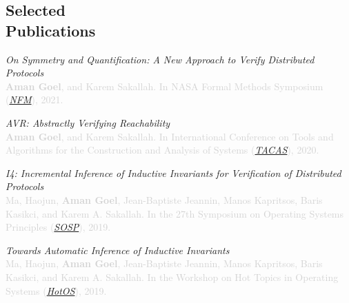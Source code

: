 \documentclass[margin,line,letter]{resume}
\begin{document}
\begin{resume}
\section{\mysidestyle Selected\\Publications \\ 
\href{https://scholar.google.com/citations?user=iFCl5vEAAAAJ&hl=en&oi=sra}{\faGraduationCap}}

\hspace{-2em} \href{https://aman-goel.github.io/publications/goel2021on_extended_version.pdf}{\faFilePdfO} \hspace{0.3em}
\textit{On Symmetry and Quantification: A New Approach to Verify Distributed Protocols} \\
\textcolor{lightgray}{\textbf{Aman Goel}, and Karem Sakallah. In NASA Formal Methods Symposium (\href{https://shemesh.larc.nasa.gov/nfm2021/}{\textit{NFM}}), 2021.}

\hspace{-2em} \href{https://link.springer.com/chapter/10.1007%2F978-3-030-45190-5_23}{\faFilePdfO} \hspace{0.3em}
\textit{AVR: Abstractly Verifying Reachability} \\
\textcolor{lightgray}{\textbf{Aman Goel}, and Karem Sakallah. In International Conference on Tools and Algorithms for the Construction and Analysis of Systems (\href{https://www.etaps.org/2020/tacas}{\textit{TACAS}}), 2020.}

\hspace{-2em} \href{https://sosp19.rcs.uwaterloo.ca/program.html}{\faFilePdfO} \hspace{0.3em}
\textit{I4: Incremental Inference of Inductive Invariants for Verification of Distributed Protocols} \\
\textcolor{lightgray}{Ma, Haojun, \textbf{Aman Goel}, Jean-Baptiste Jeannin, Manos Kapritsos, Baris Kasikci, and Karem A. Sakallah. In the 27th Symposium on Operating Systems Principles (\href{https://sosp19.rcs.uwaterloo.ca/}{\textit{SOSP}}), 2019.}

\hspace{-2em} \href{https://dl.acm.org/citation.cfm?id=3321451}{\faFilePdfO} \hspace{0.3em}
\textit{Towards Automatic Inference of Inductive Invariants} \\
\textcolor{lightgray}{Ma, Haojun, \textbf{Aman Goel}, Jean-Baptiste Jeannin, Manos Kapritsos, Baris Kasikci, and Karem A. Sakallah. In the Workshop on Hot Topics in Operating Systems (\href{https://hotos19.sigops.org/}{\textit{HotOS}}), 2019.}


\end{resume}
\end{document}
